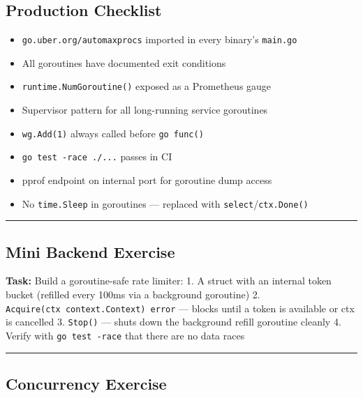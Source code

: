 \documentclass[11pt,a4paper,oneside]{book}
\providecommand{\tightlist}{\setlength{\itemsep}{0pt}\setlength{\parskip}{0pt}}
\begin{document}
\subsection{Production Checklist}

\begin{itemize}
\tightlist
\item[$\square$]
  \texttt{go.uber.org/automaxprocs} imported in every binary's
  \texttt{main.go}
\item[$\square$]
  All goroutines have documented exit conditions
\item[$\square$]
  \texttt{runtime.NumGoroutine()} exposed as a Prometheus gauge
\item[$\square$]
  Supervisor pattern for all long-running service goroutines
\item[$\square$]
  \texttt{wg.Add(1)} always called before \texttt{go\ func()}
\item[$\square$]
  \texttt{go\ test\ -race\ ./...} passes in CI
\item[$\square$]
  pprof endpoint on internal port for goroutine dump access
\item[$\square$]
  No \texttt{time.Sleep} in goroutines --- replaced with
  \texttt{select}/\texttt{ctx.Done()}
\end{itemize}

\begin{center}\rule{0.5\linewidth}{0.5pt}\end{center}

\subsection{Mini Backend Exercise}

\textbf{Task:} Build a goroutine-safe rate limiter: 1. A struct with an
internal token bucket (refilled every 100ms via a background goroutine)
2. \texttt{Acquire(ctx\ context.Context)\ error} --- blocks until a
token is available or ctx is cancelled 3. \texttt{Stop()} --- shuts down
the background refill goroutine cleanly 4. Verify with
\texttt{go\ test\ -race} that there are no data races

\begin{center}\rule{0.5\linewidth}{0.5pt}\end{center}

\subsection{Concurrency Exercise}
\end{document}
